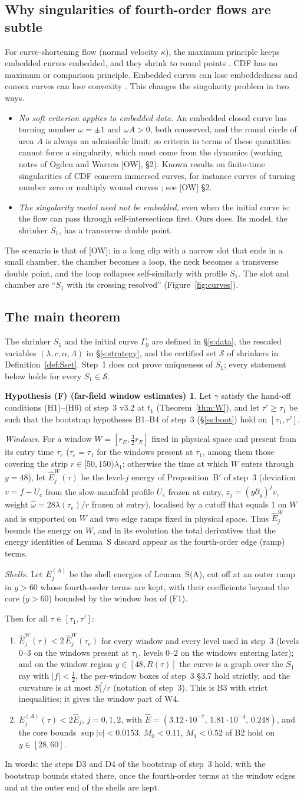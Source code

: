\documentclass[11pt]{amsart}
\theoremstyle{definition}
\newtheorem*{hypF}{Hypothesis (F) (far-field window estimates)}
\theoremstyle{remark}
\newcommand{\Lam}{\Lambda}
\newcommand{\dref}[1]{[\textsf{#1}]}
\newcommand{\Sset}{\mathcal S}
\newcommand{\GAPSTATEMENT}{%
Let $\gamma$ satisfy the hand-off conditions \textup{(H1)--(H6)} of step~3 \textup{v3.2} at $t_1$ \textup{(Theorem~\ref{thm:W})}, and let $\tau'\ge\tau_1$ be such that the bootstrap hypotheses \textup{B1--B4} of step~3 \textup{(\S\ref{ss:boot})} hold on $[\tau_1,\tau']$.

\emph{Windows.} For a window $W=[r_E,\frac32r_E]$ fixed in physical space and present from its entry time $\tau_e$ \textup{(}$\tau_e=\tau_1$ for the windows present at $\tau_1$, among them those covering the strip $r\in[50,150)\lambda_1$; otherwise the time at which $W$ enters through $y=48$\textup{)}, let $\hat E^W_j(\tau)$ be the level-$j$ energy of Proposition~B$'$ of step~3 \textup{(}deviation $v=f-U_e$ from the slow-manifold profile $U_e$ frozen at entry, $z_j=(y\partial_y)^jv$, weight $\hat\omega=28\lambda(\tau_e)/r$ frozen at entry\textup{)}, localised by a cutoff that equals $1$ on $W$ and is supported on $W$ and two edge ramps fixed in physical space. Thus $\hat E^W_j$ bounds the energy on $W$, and in its evolution the total derivatives that the energy identities of Lemma~S discard appear as the fourth-order edge \textup{(}ramp\textup{)} terms.

\emph{Shells.} Let $E^{(A)}_j$ be the shell energies of Lemma~S\textup{(A)}, cut off at an outer ramp in $y>60$ whose fourth-order terms are kept, with their coefficients beyond the core \textup{(}$y>60$\textup{)} bounded by the window box of \textup{(F1)}.

Then for all $\tau\in[\tau_1,\tau']$:
\begin{enumerate}[label=\textup{(F\arabic*)},leftmargin=2.6em,itemsep=1pt]
\item $\hat E^W_j(\tau)<2\,\hat E^W_j(\tau_e)$ for every window and every level used in step~3 \textup{(}levels $0$--$3$ on the windows present at $\tau_1$, levels $0$--$2$ on the windows entering later\textup{)}; and on the window region $y\in[48,R(\tau)]$ the curve is a graph over the $S_1$ ray with $|f|<\frac12$, the per-window boxes of step~3 \textup{\S3.7} hold strictly, and the curvature is at most $S^f_1/r$ \textup{(}notation of step~3\textup{)}. This is \textup{B3} with strict inequalities; it gives the window part of \textup{W4}.
\item $E^{(A)}_j(\tau)<2\hat E_j$, $j=0,1,2$, with $\hat E=(3.12\cdot10^{-7},\,1.81\cdot10^{-4},\,0.248)$, and the core bounds $\sup|v|<0.0153$, $M_0<0.11$, $M_1<0.52$ of \textup{B2} hold on $y\in[28,60]$.
\end{enumerate}
In words: the steps \textup{D3} and \textup{D4} of the bootstrap of step~3 hold, with the bootstrap bounds stated there, once the fourth-order terms at the window edges and at the outer end of the shells are kept.}
\begin{document}
\subsection{Why singularities of fourth-order flows are subtle}
For curve-shortening flow (normal velocity $\kappa$), the maximum principle keeps embedded curves embedded, and they shrink to round points \cite{Grayson1987}. CDF has no maximum or comparison principle. Embedded curves can lose embeddedness and convex curves can lose convexity \cite{GigaIto1998,GigaIto1999,MayerSimonett2000,Blatt2010}. This changes the singularity problem in two ways.
\begin{itemize}[leftmargin=*,itemsep=1pt]
\item \emph{No soft criterion applies to embedded data.} An embedded closed curve has turning number $\omega=\pm1$ and $\omega A>0$, both conserved, and the round circle of area $A$ is always an admissible limit; so criteria in terms of these quantities cannot force a singularity, which must come from the dynamics (working notes of Ogden and Warren \dref{OW}, \S2). Known results on finite-time singularities of CDF concern immersed curves, for instance curves of turning number zero or multiply wound curves \cite{Chou2003,EscherIto2005,EGMWW2015}; see \dref{OW} \S2.
\item \emph{The singularity model need not be embedded,} even when the initial curve is: the flow can pass through self-intersections first. Ours does. Its model, the shrinker $S_1$, has a transverse double point.
\end{itemize}
The scenario is that of \dref{OW}: in a long clip with a narrow slot that ends in a small chamber, the chamber becomes a loop, the neck becomes a transverse double point, and the loop collapses self-similarly with profile $S_1$. The slot and chamber are ``$S_1$ with its crossing resolved'' (Figure~\ref{fig:curves}).

\subsection{The main theorem}\label{ss:main}
The shrinker $S_1$ and the initial curve $\Gamma_0$ are defined in \S\ref{s:data}, the rescaled variables $(\lambda,c,\alpha,\Lam)$ in \S\ref{s:strategy}, and the certified set $\Sset$ of shrinkers in Definition~\ref{def:Sset}. Step~1 does not prove uniqueness of $S_1$; every statement below holds for every $S_1\in\Sset$.

\begin{hypF}
\GAPSTATEMENT
\end{hypF}
\end{document}
